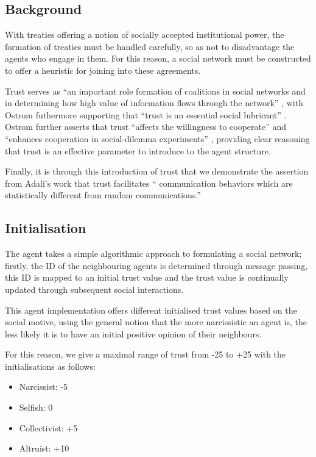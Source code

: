 \subsection{Background}

With treaties offering a notion of socially accepted institutional power, the formation of treaties must be handled carefully, so as not to disadvantage the agents who engage in them. For this reason, a social network must be constructed to offer a heuristic for joining into these agreements. 

Trust serves as ``an important role formation of coalitions in social networks and in determining how high value of information flows through the network'' \cite{trustEEE}, with Ostrom futhermore supporting that ``trust is an essential social lubricant'' \cite{ostrom2003trust}. Ostrom further asserts that trust ``affects the willingness to cooperate'' \cite{ostrom2003trust} and ``enhances cooperation in social-dilemma experiments'' \cite{ostrom2003trust}, providing clear reasoning that trust is an effective parameter to introduce to the agent structure.

Finally, it is through this introduction of trust that we demonstrate the assertion from Adali's work \cite{trustEEE} that trust facilitates `` communication behaviors which are statistically different from random communications.''

\subsection{Initialisation}
The agent takes a simple algorithmic approach to formulating a social network; firstly, the ID of the neighbouring agents is determined through message passing, this ID is mapped to an initial trust value and the trust value is continually updated through subsequent social interactions. 

This agent implementation offers different initialised trust values based on the social motive, using the general notion that the more narcissistic an agent is, the less likely it is to have an initial positive opinion of their neighbours. 

For this reason, we give a maximal range of trust from -25 to +25 with the initialisations as follows:

\begin{itemize}
    \item Narcissist: -5
    \item Selfish: 0
    \item Collectivist: +5
    \item Altruist: +10
\end{itemize}

